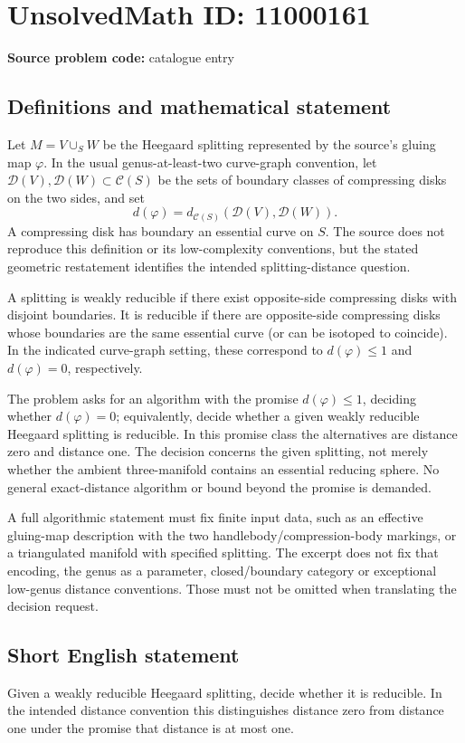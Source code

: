 \documentclass[11pt]{article}
\begin{document}
\section*{UnsolvedMath ID: 11000161}
\textbf{Source problem code:} catalogue entry
\subsection{Definitions and mathematical statement}
Let \(M=V\cup_S W\) be the Heegaard splitting represented by the source's gluing map \(\varphi\). In the usual genus-at-least-two curve-graph convention, let \(\mathcal D(V),\mathcal D(W)\subset\mathcal C(S)\) be the sets of boundary classes of compressing disks on the two sides, and set
\[d(\varphi)=d_{\mathcal C(S)}(\mathcal D(V),\mathcal D(W)).\]
A compressing disk has boundary an essential curve on \(S\). The source does not reproduce this definition or its low-complexity conventions, but the stated geometric restatement identifies the intended splitting-distance question.

A splitting is weakly reducible if there exist opposite-side compressing disks with disjoint boundaries. It is reducible if there are opposite-side compressing disks whose boundaries are the same essential curve (or can be isotoped to coincide). In the indicated curve-graph setting, these correspond to \(d(\varphi)\leq1\) and \(d(\varphi)=0\), respectively.

The problem asks for an algorithm with the promise \(d(\varphi)\leq1\), deciding whether \(d(\varphi)=0\); equivalently, decide whether a given weakly reducible Heegaard splitting is reducible. In this promise class the alternatives are distance zero and distance one. The decision concerns the given splitting, not merely whether the ambient three-manifold contains an essential reducing sphere. No general exact-distance algorithm or bound beyond the promise is demanded.

A full algorithmic statement must fix finite input data, such as an effective gluing-map description with the two handlebody/compression-body markings, or a triangulated manifold with specified splitting. The excerpt does not fix that encoding, the genus as a parameter, closed/boundary category or exceptional low-genus distance conventions. Those must not be omitted when translating the decision request.
\subsection{Short English statement}
Given a weakly reducible Heegaard splitting, decide whether it is reducible. In the intended distance convention this distinguishes distance zero from distance one under the promise that distance is at most one.
\end{document}
